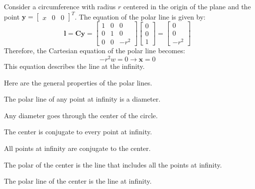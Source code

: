 \begin{example}
    Consider a circumference with radius $r$ centered in the origin of the plane and the point $\mathbf{y}={\begin{bmatrix} x & 0 & 0 \end{bmatrix}}^T$.
    The equation of the polar line is given by:
    \[\mathbf{l}=\mathbf{Cy}=\begin{bmatrix} 1 & 0 & 0 \\ 0 & 1 & 0 \\ 0 & 0 & -r^2 \end{bmatrix}\begin{bmatrix} 0 \\ 0 \\ 1 \end{bmatrix} = \begin{bmatrix} 0 \\ 0 \\ -r^2 \end{bmatrix}\]
    Therefore, the Cartesian equation of the polar line becomes: 
    \[-r^2w=0 \rightarrow \mathbf{x}=0\]
    This equation describes the line at the infinity. 
\end{example}
Here are the general properties of the polar lines.
\begin{property}
    The polar line of any point at infinity is a diameter.
\end{property}
\begin{property}
    Any diameter goes through the center of the circle.
\end{property}
\begin{property}
    The center is conjugate to every point at infinity.
\end{property}
\begin{property}
    All points at infinity are conjugate to the center.
\end{property}
\begin{property}
    The polar of the center is the line that includes all the points at infinity.
\end{property}
\begin{property}
    The polar line of the center is the line at infinity.
\end{property}

